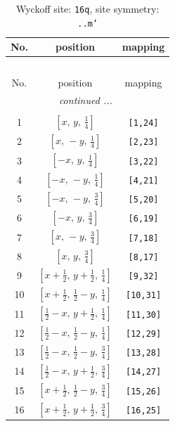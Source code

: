 \documentclass[fleqn,8pt]{jsarticle}
\begin{document}
\renewcommand{\arraystretch}{1.2}
\begin{longtable}{ccc}
\caption{Wyckoff site: {\tt 16q}, site symmetry: {\tt ..m'}}
 \\
 \hline \hline
No. & position & mapping \\ \hline \endfirsthead

\multicolumn{2}{l}{\tablename\ \thetable{}} \\
 \hline \hline
No. & position & mapping \\ \hline \endhead

 \hline \hline
\multicolumn{2}{r}{\footnotesize\it continued ...} \\ \endfoot

 \hline \hline
\multicolumn{2}{r}{} \\ \endlastfoot

1 & $\left[ x,\, y,\, \frac{1}{4} \right]$ & {\tt [1,24]} \\ \hline
2 & $\left[ x,\, - y,\, \frac{1}{4} \right]$ & {\tt [2,23]} \\ \hline
3 & $\left[ - x,\, y,\, \frac{1}{4} \right]$ & {\tt [3,22]} \\ \hline
4 & $\left[ - x,\, - y,\, \frac{1}{4} \right]$ & {\tt [4,21]} \\ \hline
5 & $\left[ - x,\, - y,\, \frac{3}{4} \right]$ & {\tt [5,20]} \\ \hline
6 & $\left[ - x,\, y,\, \frac{3}{4} \right]$ & {\tt [6,19]} \\ \hline
7 & $\left[ x,\, - y,\, \frac{3}{4} \right]$ & {\tt [7,18]} \\ \hline
8 & $\left[ x,\, y,\, \frac{3}{4} \right]$ & {\tt [8,17]} \\ \hline
9 & $\left[ x + \frac{1}{2},\, y + \frac{1}{2},\, \frac{1}{4} \right]$ & {\tt [9,32]} \\ \hline
10 & $\left[ x + \frac{1}{2},\, \frac{1}{2} - y,\, \frac{1}{4} \right]$ & {\tt [10,31]} \\ \hline
11 & $\left[ \frac{1}{2} - x,\, y + \frac{1}{2},\, \frac{1}{4} \right]$ & {\tt [11,30]} \\ \hline
12 & $\left[ \frac{1}{2} - x,\, \frac{1}{2} - y,\, \frac{1}{4} \right]$ & {\tt [12,29]} \\ \hline
13 & $\left[ \frac{1}{2} - x,\, \frac{1}{2} - y,\, \frac{3}{4} \right]$ & {\tt [13,28]} \\ \hline
14 & $\left[ \frac{1}{2} - x,\, y + \frac{1}{2},\, \frac{3}{4} \right]$ & {\tt [14,27]} \\ \hline
15 & $\left[ x + \frac{1}{2},\, \frac{1}{2} - y,\, \frac{3}{4} \right]$ & {\tt [15,26]} \\ \hline
16 & $\left[ x + \frac{1}{2},\, y + \frac{1}{2},\, \frac{3}{4} \right]$ & {\tt [16,25]} \\
\end{longtable}
\end{document}
